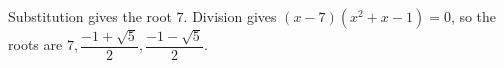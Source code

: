Substitution gives the root $7$. Division gives $(x-7)(x^2+x-1)=0$, so the roots are $\boxed{7,\dfrac{-1+\sqrt5}{2},\dfrac{-1-\sqrt5}{2}}$.
